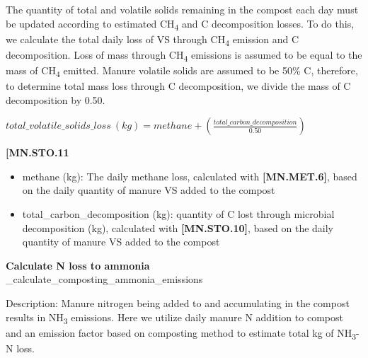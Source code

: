 \begin{refsection}
The quantity of total and volatile solids remaining in the compost each day must be updated according to estimated CH\textsubscript{4} and C decomposition losses. To do this, we calculate the total daily loss of VS through CH\textsubscript{4} emission and C decomposition. Loss of mass through CH\textsubscript{4} emissions is assumed to be equal to the mass of CH\textsubscript{4} emitted. Manure volatile solids are assumed to be 50\% C, therefore, to determine total mass loss through C decomposition, we divide the mass of C decomposition by 0.50. 
            \vspace{0.25cm}

        \begin{center}
            \(total\_volatile\_solids\_loss\ (kg) = methane + (\frac{total\_carbon\_decomposition}{0.50})\)
        \end{center}
        \vspace{0.5cm} 
    
            {\raggedleft \textbf{[MN.STO.11}\par}
            \vspace{0.5cm}
            
        \begin{itemize}
            \item methane (kg): The daily methane loss, calculated with \textbf{[MN.MET.6]}, based on the daily quantity of manure VS added to the compost
            \item total\_carbon\_decomposition (kg): quantity of C lost through microbial decomposition (kg), calculated with \textbf{[MN.STO.10]}, based on the daily quantity of manure VS added to the compost
        \end{itemize}




\textbf{Calculate N loss to ammonia}\\
\_calculate\_composting\_ammonia\_emissions\\
\vspace{0.2cm}

Description: Manure nitrogen being added to and accumulating in the compost results in NH\textsubscript{3} emissions. Here we utilize daily manure N addition to compost and an emission factor based on composting method  \parencite{Hanson2024} to estimate total kg of NH\textsubscript{3}-N loss.


    \begin{table}[h!]
    \centering
    \renewcommand{\arraystretch}{1.3}
    \begin{center}
        \caption{NH\textsubscript{3}-N emission factors for compost by composting method.}
    \end{center}
    \vspace{-0.2cm}
    

\end{table}
\end{refsection}
